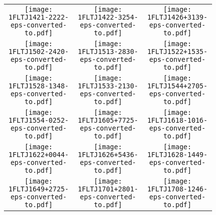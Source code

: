 \begin{figure}[!t]
	\centering            
	\ContinuedFloat 
\setlength\tabcolsep{0.0pt}
\begin{tabular}{ccc} 
  \texttt{[image: 1FLTJ1421-2222-eps-converted-to.pdf]}\label{fig:1FLTJ1421-2222}&
  \texttt{[image: 1FLTJ1422-3254-eps-converted-to.pdf]}\label{fig:1FLTJ1422-3254}&
  \texttt{[image: 1FLTJ1426+3139-eps-converted-to.pdf]}\label{fig:1FLTJ1426+3139}\\
  \texttt{[image: 1FLTJ1502-2420-eps-converted-to.pdf]}\label{fig:1FLTJ1502-2420}&
  \texttt{[image: 1FLTJ1513-2830-eps-converted-to.pdf]}\label{fig:1FLTJ1513-2830}&
  \texttt{[image: 1FLTJ1522+1535-eps-converted-to.pdf]}\label{fig:1FLTJ1522+1535}\\
  \texttt{[image: 1FLTJ1528-1348-eps-converted-to.pdf]}\label{fig:1FLTJ1528-1348}&
  \texttt{[image: 1FLTJ1533-2130-eps-converted-to.pdf]}\label{fig:1FLTJ1533-2130}&
  \texttt{[image: 1FLTJ1544+2705-eps-converted-to.pdf]}\label{fig:1FLTJ1544+2705}\\
  \texttt{[image: 1FLTJ1554-0252-eps-converted-to.pdf]}\label{fig:1FLTJ1554-0252}&
  \texttt{[image: 1FLTJ1605+7725-eps-converted-to.pdf]}\label{fig:1FLTJ1605+7725}&
  \texttt{[image: 1FLTJ1618-1016-eps-converted-to.pdf]}\label{fig:1FLTJ1618-1016}\\
  \texttt{[image: 1FLTJ1622+0044-eps-converted-to.pdf]}\label{fig:1FLTJ1622+0044}&
  \texttt{[image: 1FLTJ1626+5436-eps-converted-to.pdf]}\label{fig:1FLTJ1626+5436}&
  \texttt{[image: 1FLTJ1628-1449-eps-converted-to.pdf]}\label{fig:1FLTJ1628-1449}\\
  \texttt{[image: 1FLTJ1649+2725-eps-converted-to.pdf]}\label{fig:1FLTJ1649+2725}&
  \texttt{[image: 1FLTJ1701+2801-eps-converted-to.pdf]}\label{fig:1FLTJ1701+2801}&
  \texttt{[image: 1FLTJ1708-1246-eps-converted-to.pdf]}\label{fig:1FLTJ1708-1246}\\
\end{tabular}
\end{figure}
